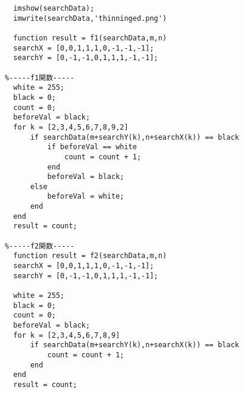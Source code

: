 \documentclass[a4j]{jarticle}
\begin{document}
\begin{verbatim}
  imshow(searchData);
  imwrite(searchData,'thinninged.png')

  function result = f1(searchData,m,n)
  searchX = [0,0,1,1,1,0,-1,-1,-1];
  searchY = [0,-1,-1,0,1,1,1,-1,-1];

%-----f1関数-----
  white = 255;
  black = 0;
  count = 0;
  beforeVal = black;
  for k = [2,3,4,5,6,7,8,9,2]
      if searchData(m+searchY(k),n+searchX(k)) == black
          if beforeVal == white
              count = count + 1;
          end
          beforeVal = black;
      else
          beforeVal = white;
      end
  end
  result = count;

%-----f2関数-----
  function result = f2(searchData,m,n)
  searchX = [0,0,1,1,1,0,-1,-1,-1];
  searchY = [0,-1,-1,0,1,1,1,-1,-1];

  white = 255;
  black = 0;
  count = 0;
  beforeVal = black;
  for k = [2,3,4,5,6,7,8,9]
      if searchData(m+searchY(k),n+searchX(k)) == black
          count = count + 1;
      end
  end
  result = count;



\end{verbatim}
\end{document}
